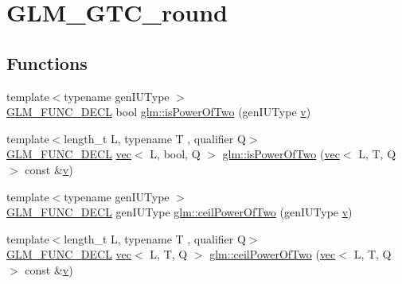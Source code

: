 \hypertarget{group__gtc__round}{}\section{G\+L\+M\+\_\+\+G\+T\+C\+\_\+round}
\label{group__gtc__round}
\subsection*{Functions}
\begin{DoxyCompactItemize}
\item 
{\footnotesize template$<$typename gen\+I\+U\+Type $>$ }\\\mbox{\hyperlink{setup_8hpp_ab2d052de21a70539923e9bcbf6e83a51}{G\+L\+M\+\_\+\+F\+U\+N\+C\+\_\+\+D\+E\+CL}} bool \mbox{\hyperlink{group__gtc__round_gadf491730354aa7da67fbe23d4d688763}{glm\+::is\+Power\+Of\+Two}} (gen\+I\+U\+Type \mbox{\hyperlink{_s_d_l__opengl_8h_a10a82eabcb59d2fcd74acee063775f90}{v}})
\item 
{\footnotesize template$<$length\+\_\+t L, typename T , qualifier Q$>$ }\\\mbox{\hyperlink{setup_8hpp_ab2d052de21a70539923e9bcbf6e83a51}{G\+L\+M\+\_\+\+F\+U\+N\+C\+\_\+\+D\+E\+CL}} \mbox{\hyperlink{structglm_1_1vec}{vec}}$<$ L, bool, Q $>$ \mbox{\hyperlink{group__gtc__round_gabf2b61ded7049bcb13e25164f832a290}{glm\+::is\+Power\+Of\+Two}} (\mbox{\hyperlink{structglm_1_1vec}{vec}}$<$ L, T, Q $>$ const \&\mbox{\hyperlink{_s_d_l__opengl_8h_a10a82eabcb59d2fcd74acee063775f90}{v}})
\item 
{\footnotesize template$<$typename gen\+I\+U\+Type $>$ }\\\mbox{\hyperlink{setup_8hpp_ab2d052de21a70539923e9bcbf6e83a51}{G\+L\+M\+\_\+\+F\+U\+N\+C\+\_\+\+D\+E\+CL}} gen\+I\+U\+Type \mbox{\hyperlink{group__gtc__round_ga5c3ef36ae32aa4271f1544f92bd578b6}{glm\+::ceil\+Power\+Of\+Two}} (gen\+I\+U\+Type \mbox{\hyperlink{_s_d_l__opengl_8h_a10a82eabcb59d2fcd74acee063775f90}{v}})
\item 
{\footnotesize template$<$length\+\_\+t L, typename T , qualifier Q$>$ }\\\mbox{\hyperlink{setup_8hpp_ab2d052de21a70539923e9bcbf6e83a51}{G\+L\+M\+\_\+\+F\+U\+N\+C\+\_\+\+D\+E\+CL}} \mbox{\hyperlink{structglm_1_1vec}{vec}}$<$ L, T, Q $>$ \mbox{\hyperlink{group__gtc__round_gab53d4a97c0d3e297be5f693cdfdfe5d2}{glm\+::ceil\+Power\+Of\+Two}} (\mbox{\hyperlink{structglm_1_1vec}{vec}}$<$ L, T, Q $>$ const \&\mbox{\hyperlink{_s_d_l__opengl_8h_a10a82eabcb59d2fcd74acee063775f90}{v}})

\end{DoxyCompactItemize}
